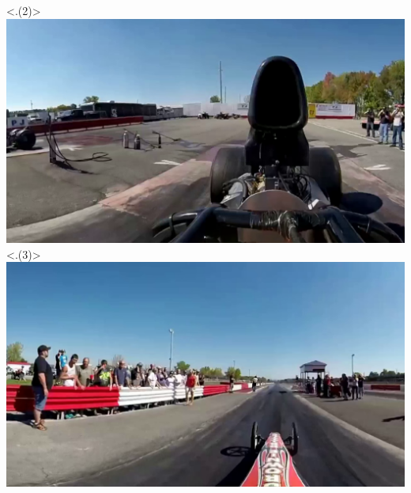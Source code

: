 \begin{frame}[c]
\begin{minipage}[t][7cm][t]{\textwidth}
{\begin{columns}[T]
\begin{column}{0.5\linewidth}
               \only<.(2)>{\hspace{2cm}\includegraphics[scale=0.065]{videos/fov1.png}}
               \only<.(3)>{\hspace{2cm}\includegraphics[scale=0.065]{videos/fov2.png}}
            \end{column}
         \end{columns}
      }
    \end{minipage}
    \vfill
\end{frame}

